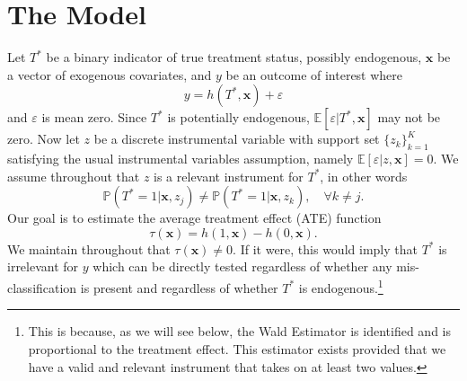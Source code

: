 \section{The Model}
Let $T^*$ be a binary indicator of true treatment status, possibly endogenous, $\mathbf{x}$ be a vector of exogenous covariates, and $y$ be an outcome of interest where
\begin{equation}
  y = h(T^*, \mathbf{x}) + \varepsilon
  \label{eq:model}
\end{equation}
and $\varepsilon$ is mean zero.
Since $T^*$ is potentially endogenous, $\mathbb{E}[\varepsilon|T^*,\mathbf{x}]$ may not be zero.
Now let $z$ be a discrete instrumental variable with support set $\{z_k\}_{k=1}^K$ satisfying the usual instrumental variables assumption, namely $\mathbb{E}[\varepsilon|z,\mathbf{x}]=0$.
We assume throughout that $z$ is a relevant instrument for $T^*$, in other words 
\begin{equation}
\mathbb{P}(T^*=1|\mathbf{x},z_j)\neq \mathbb{P}(T^*=1|\mathbf{x},z_k), \quad \forall k\neq j.
\label{eq:relevance}
\end{equation}
Our goal is to estimate the average treatment effect (ATE) function
\begin{equation}
  \tau(\mathbf{x}) = h(1,\mathbf{x}) - h(0,\mathbf{x}).
  \label{eq:ATE}
\end{equation}
We maintain throughout that $\tau(\mathbf{x}) \neq 0$.
If it were, this would imply that $T^*$ is irrelevant for $y$ which can be directly tested regardless of whether any mis-classification is present and regardless of whether $T^*$ is endogenous.\footnote{This is because, as we will see below, the Wald Estimator is identified and is proportional to the treatment effect. This estimator exists provided that we have a valid and relevant instrument that takes on at least two values.} 


